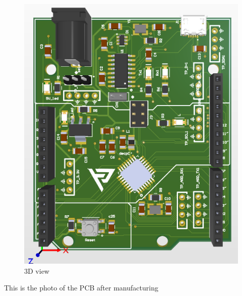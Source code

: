 \documentclass[a4paper,11pt]{article}%
\begin{document}
\begin{figure}[H]
	\centering
	\includegraphics[scale=0.6]{figures/pcb/3d.png}
	\caption{3D view}
	\label{top}
\end{figure}



This is the photo of the PCB after manufacturing\\
\end{document}
